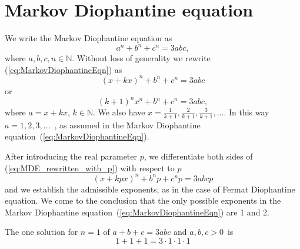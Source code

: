 \documentclass[11pt]{article}
\begin{document}

\section{Markov Diophantine equation}\label{MarkovEquation}


We write the Markov Diophantine equation \cite{Markov1879, Frobenius1913, Gyoda2022} as
\begin{equation}
\label{eq:MarkovDiophantineEqn}
a^{n} + b^{n} + c^{n} = 3\mathit{abc},
\end{equation}
where $a, b, c, n \in \mathbb{N}$.
Without loss of generality we rewrite (\ref{eq:MarkovDiophantineEqn}) as
\begin{equation}
(x + kx)^{n} + b^{n} + c^{n} = 3\mathit{abc}
\end{equation}
or
\begin{equation}
\label{eq:MDE_rewritten_x}
(k + 1)^{n} x^{n} + b^{n} + c^{n} = 3\mathit{abc},
\end{equation}
where $a = x + kx$, $k \in \mathbb{N}$.
We also have $x = \frac{1}{k+1}, \frac{2}{k+1}, \frac{3}{k+1}, \ldots$\@.
In this way $a = 1, 2, 3, \ldots$~, as assumed in the Markov Diophantine
equation~(\ref{eq:MarkovDiophantineEqn})\@.

After introducing the real parameter $p$,
we differentiate both sides of (\ref{eq:MDE_rewritten_with_p}) with respect to $p$
\begin{equation}
\label{eq:MDE_rewritten_with_p}
(x + kpx)^{n} + b^{n}p + c^{n}p = 3\mathit{abc}p
\end{equation}
and we establish the admissible exponents, as in the case of Fermat Diophantine equation.
We come to the
conclusion that the only possible exponents in the Markov Diophantine equation~(\ref{eq:MarkovDiophantineEqn})
are 1 and 2.

The one solution for $n = 1$ of $a + b + c = 3\mathit{abc}$ and $a, b, c > 0$~is
\begin{equation}
1 + 1 + 1 = 3 \cdot 1 \cdot 1 \cdot 1
\end{equation}
\end{document}
